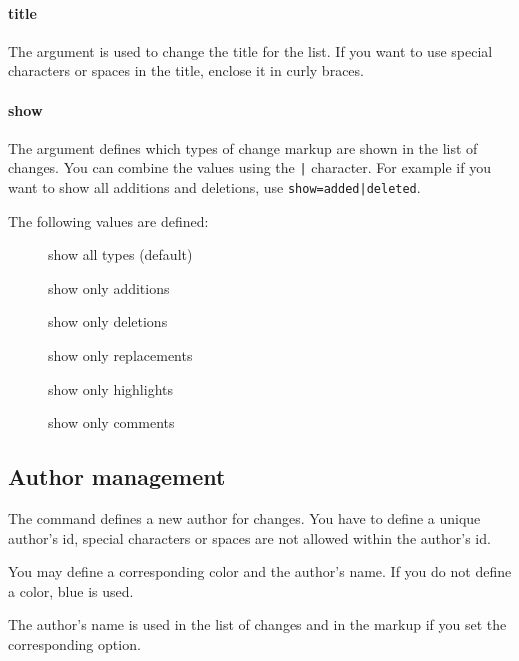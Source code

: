 \paragraph{title}
The  argument is used to change the title for the list.
If you want to use special characters or spaces in the title, enclose it in curly braces.

\paragraph{show}
The  argument defines which types of change markup are shown in the list of changes.
You can combine the values using the \texttt{|} character.
For example if you want to show all additions and deletions, use \texttt{show=added|deleted}.

The following values are defined:

\begin{description}
	\item[] show all types (default)
	\item[] show only additions
	\item[] show only deletions
	\item[] show only replacements
	\item[] show only highlights
	\item[] show only comments
\end{description}




\subsection{Author management}
\label{sec:ui:authormanagement}



The command  defines a new author for changes.
You have to define a unique author's id, special characters or spaces are not allowed within the author's id.

You may define a corresponding color and the author's name.
If you do not define a color, blue is used.

The author's name is used in the list of changes and in the markup if you set the corresponding option.

